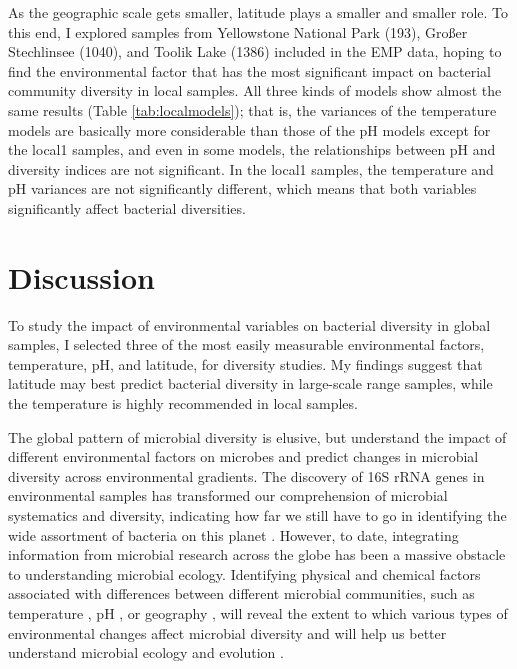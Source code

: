 \documentclass[11pt, a4paper]{article}
\begin{document}
\begin{spacing}{1.5}
As the geographic scale gets smaller, latitude plays a smaller and smaller role. To this end, I explored samples from Yellowstone National Park (193), Großer Stechlinsee (1040), and Toolik Lake (1386) \citep{crump2012microbial} included in the EMP data, hoping to find the environmental factor that has the most significant impact on bacterial community diversity in local samples. All three kinds of models show almost the same results (Table \ref{tab:localmodels}); that is, the variances of the temperature models are basically more considerable than those of the pH models except for the local1 samples, and even in some models, the relationships between pH and diversity indices are not significant. In the local1 samples, the temperature and pH variances are not significantly different, which means that both variables significantly affect bacterial diversities.

\section{Discussion}

To study the impact of environmental variables on bacterial diversity in global samples, I selected three of the most easily measurable environmental factors, temperature, pH, and latitude, for diversity studies. My findings suggest that latitude may best predict bacterial diversity in large-scale range samples, while the temperature is highly recommended in local samples.  

The global pattern of microbial diversity is elusive, but understand the impact of different environmental factors on microbes and predict changes in microbial diversity across environmental gradients. The discovery of 16S rRNA genes in environmental samples has transformed our comprehension of microbial systematics and diversity, indicating how far we still have to go in identifying the wide assortment of bacteria on this planet \citep{hugenholtz1998impact, pace1997molecular, schloss2004status}. However, to date, integrating information from microbial research across the globe has been a massive obstacle to understanding microbial ecology. Identifying physical and chemical factors associated with differences between different microbial communities, such as temperature \citep{hicks2018temperature, kitidis2017seasonal}, pH \citep{delgado2019cross, fierer2006diversity}, or geography \citep{bates2013global, bik2012metagenetic, salazar2016global}, will reveal the extent to which various types of environmental changes affect microbial diversity and will help us better understand microbial ecology and evolution \citep{lozupone2007global, moran2015global, shoemaker2017macroecological}. 


\end{spacing}
\end{document}
